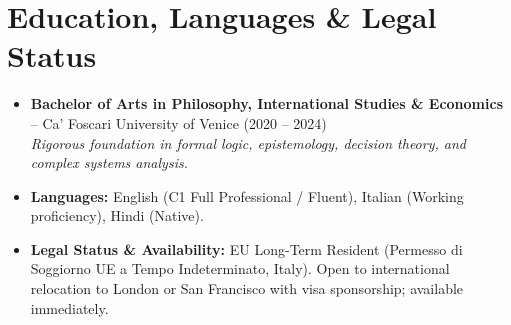 \documentclass[a4paper,10pt]{article}
\begin{document}
\section{Education, Languages \& Legal Status}
\begin{itemize}
  \item \textbf{Bachelor of Arts in Philosophy, International Studies \& Economics} -- Ca' Foscari University of Venice (2020 -- 2024) \\
  \textit{Rigorous foundation in formal logic, epistemology, decision theory, and complex systems analysis.}
  \item \textbf{Languages:} English (C1 Full Professional / Fluent), Italian (Working proficiency), Hindi (Native).
  \item \textbf{Legal Status \& Availability:} EU Long-Term Resident (Permesso di Soggiorno UE a Tempo Indeterminato, Italy). Open to international relocation to London or San Francisco with visa sponsorship; available immediately.
\end{itemize}
\end{document}
